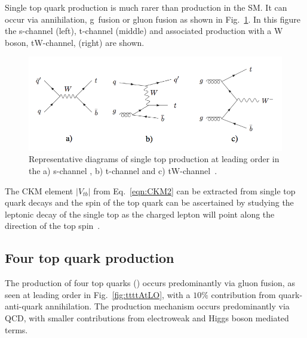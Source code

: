 Single top quark production is much rarer than \ttbar production in the SM. It can occur via \qqbar annihilation, g\cPq~fusion or gluon fusion as shown in Fig.~\ref{fig:stFeyn}. In this figure the s-channel (left), t-channel (middle) and associated production with a W boson, tW-channel, (right) are shown.

\begin{figure}[ht!]
\begin{center}
    \includegraphics[width=\textwidth]{images/Theory/stFeyn.png}
    \caption{Representative diagrams of single top production at leading order in the a) s-channel , b) t-channel and c) tW-channel~\cite{Lannon:2012fp}.}
    \label{fig:stFeyn}
\end{center}
\end{figure}

The CKM element $|V_{tb}|$ from Eq.~\ref{eqn:CKM2} can be extracted from single top quark decays and the spin of the top quark can be ascertained by studying the leptonic decay of the single top as the charged lepton will point along the direction of the top spin~\cite{Boos:2012hi}.

\subsection{Four top quark production}

The production of four top quarks (\tttt) occurs predominantly via gluon fusion, as seen at leading order in Fig.~\ref{fig:ttttAtLO}, with a $10\%$ contribution from quark-anti-quark annihilation. The production mechanism occurs predominantly via QCD, with smaller contributions from electroweak and Higgs boson mediated terms.



